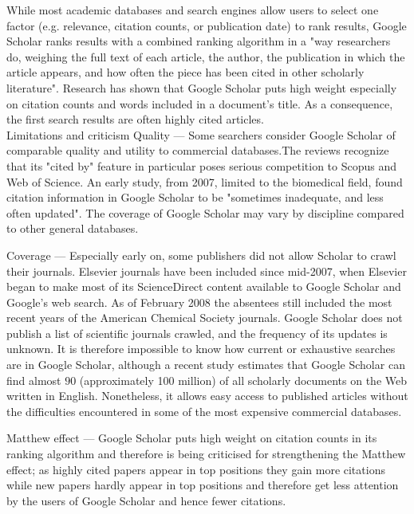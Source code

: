 \begin{enumerate}
	While most academic databases and search engines allow users to select one factor (e.g. relevance, citation counts, or publication date) to rank results, Google Scholar ranks results with a combined ranking algorithm in a "way researchers do, weighing the full text of each article, the author, the publication in which the article appears, and how often the piece has been cited in other scholarly literature". Research has shown that Google Scholar puts high weight especially on citation counts and words included in a document's title. As a consequence, the first search results are often highly cited articles.\\
		
	Limitations and criticism
	Quality — Some searchers consider Google Scholar of comparable quality and utility to commercial databases.The reviews recognize that its "cited by" feature in particular poses serious competition to Scopus and Web of Science. An early study, from 2007, limited to the biomedical field, found citation information in Google Scholar to be "sometimes inadequate, and less often updated". The coverage of Google Scholar may vary by discipline compared to other general databases.
	
	Coverage — Especially early on, some publishers did not allow Scholar to crawl their journals. Elsevier journals have been included since mid-2007, when Elsevier began to make most of its ScienceDirect content available to Google Scholar and Google's web search. As of February 2008 the absentees still included the most recent years of the American Chemical Society journals. Google Scholar does not publish a list of scientific journals crawled, and the frequency of its updates is unknown. It is therefore impossible to know how current or exhaustive searches are in Google Scholar, although a recent study estimates that Google Scholar can find almost $90$ (approximately 100 million) of all scholarly documents on the Web written in English. Nonetheless, it allows easy access to published articles without the difficulties encountered in some of the most expensive commercial databases.
	
	Matthew effect — Google Scholar puts high weight on citation counts in its ranking algorithm and therefore is being criticised for strengthening the Matthew effect; as highly cited papers appear in top positions they gain more citations while new papers hardly appear in top positions and therefore get less attention by the users of Google Scholar and hence fewer citations.
	

\end{enumerate}
